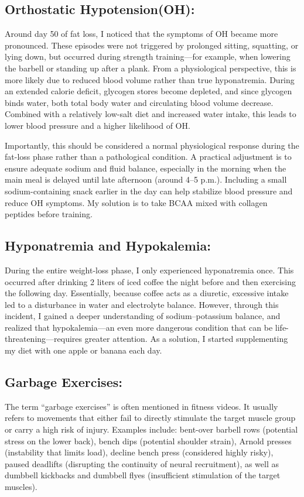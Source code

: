 \subsection{Orthostatic Hypotension(OH):}
Around day 50 of fat loss, I noticed that the symptoms of OH became more pronounced. These episodes were not triggered by prolonged sitting, squatting, or lying down, but occurred during strength training—for example, when lowering the barbell or standing up after a plank. From a physiological perspective, this is more likely due to reduced blood volume rather than true hyponatremia. During an extended calorie deficit, glycogen stores become depleted, and since glycogen binds water, both total body water and circulating blood volume decrease. Combined with a relatively low-salt diet and increased water intake, this leads to lower blood pressure and a higher likelihood of OH.

Importantly, this should be considered a normal physiological response during the fat-loss phase rather than a pathological condition. A practical adjustment is to ensure adequate sodium and fluid balance, especially in the morning when the main meal is delayed until late afternoon (around 4–5 p.m.). Including a small sodium-containing snack earlier in the day can help stabilize blood pressure and reduce OH symptoms. My solution is to take BCAA mixed with collagen peptides before training.

\subsection{Hyponatremia and Hypokalemia:}
During the entire weight-loss phase, I only experienced hyponatremia once. This occurred after drinking 2 liters of iced coffee the night before and then exercising the following day. Essentially, because coffee acts as a diuretic, excessive intake led to a disturbance in water and electrolyte balance. However, through this incident, I gained a deeper understanding of sodium–potassium balance, and realized that hypokalemia—an even more dangerous condition that can be life-threatening—requires greater attention. As a solution, I started supplementing my diet with one apple or banana each day.

\subsection{Garbage Exercises:}
The term “garbage exercises” is often mentioned in fitness videos. It usually refers to movements that either fail to directly stimulate the target muscle group or carry a high risk of injury. Examples include: bent-over barbell rows (potential stress on the lower back), bench dips (potential shoulder strain), Arnold presses (instability that limits load), decline bench press (considered highly risky), paused deadlifts (disrupting the continuity of neural recruitment), as well as dumbbell kickbacks and dumbbell flyes (insufficient stimulation of the target muscles).

